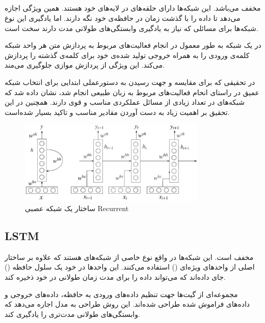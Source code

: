 \documentclass[12pt, a4paper, oneside]{report}
\begin{document}
\subsection{}

مخفف
می‌باشد. این شبکه‌ها دارای حلقه‌های
در لایه‌های خود هستند. همین ویژگی اجازه می‌دهد تا داده را با گذشت زمان در حافظه‌ی خود نگه دارند.
اما یادگیری این نوع شبکه‌ها برای مسائلی که نیاز به یادگیری وابستگی‌های طولانی مدت دارند سخت است.

در یک شبکه
به طور معمول در انجام فعالیت‌های مربوط به پردازش متن هر واحد شبکه کلمه‌ی ورودی را به همراه
خروجی تولید شده‌ی خود برای کلمه‌ی گذشته را پردازش می‌کند. این ویژگی از پردازش موازی جلوگیری می‌مند\cite{iyyer-etal-2015-deep}.

در تحقیقی که برای مقایسه
و
جهت رسیدن به دستورعملی ابتدایی برای انتخاب شبکه عمیق در راستای انحام فعالیت‌های مربوط به زبان طبیعی
انجام شد، نشان داده شد که شبکه‌های
در تعداد زیادی از مسائل عملکردی مناسب و قوی دارند. همچنین در این تحقیق بر اهمیت زیاد به دست آوردن
مقادیر مناسب
و
تاکید بسیار شده‌است\cite{8844895}.

\begin{figure}[h]
    \centering
    \includegraphics[width=0.8\textwidth]{rnn}
    \caption{ساختار یک شبکه عصبی Recurrent}
    \label{fig:rnn}
\end{figure}

\subsection{LSTM}

مخفف
است. این شبکه‌ها در واقع نوع خاصی از شبکه‌های
هستند که علاوه بر ساختار اصلی از واحد‌های ویژه‌ای
()
استفاده می‌کنند. این واحدها در خود یک سلول حافظه
()
جای داده‌اند که می‌تواند داده را برای مدت زمان طولانی در خود ذخیره کند.

مجموعه‌ای از گیت‌ها جهت تنظیم داده‌های ورودی به حافظه، داده‌های خروجی و داده‌های فراموش شده طراحی
شده‌اند. این روش طراحی به مدل اجاره می‌دهد که وابستگی‌های طولانی مدت‌تری را یادگیری کند\cite{8844895}.
\end{document}
